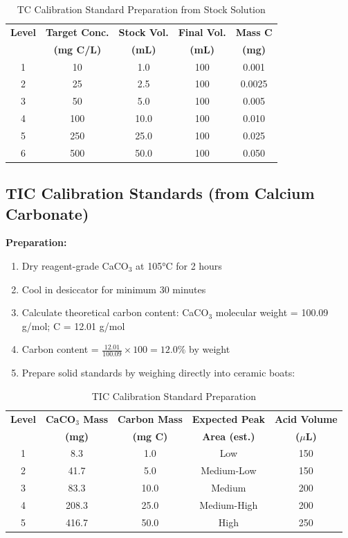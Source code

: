 \documentclass[11pt,a4paper]{article}\usepackage[]{graphicx}\usepackage[]{xcolor}
\begin{document}
\begin{table}[h]
\centering
\small
\begin{tabular}{ccccc}
\toprule
\textbf{Level} & \textbf{Target Conc.} & \textbf{Stock Vol.} & \textbf{Final Vol.} & \textbf{Mass C} \\
 & \textbf{(mg C/L)} & \textbf{(mL)} & \textbf{(mL)} & \textbf{(mg)} \\
\midrule
1 & 10 & 1.0 & 100 & 0.001 \\
2 & 25 & 2.5 & 100 & 0.0025 \\
3 & 50 & 5.0 & 100 & 0.005 \\
4 & 100 & 10.0 & 100 & 0.010 \\
5 & 250 & 25.0 & 100 & 0.025 \\
6 & 500 & 50.0 & 100 & 0.050 \\
\bottomrule
\end{tabular}
\caption{TC Calibration Standard Preparation from Stock Solution}
\end{table}

\subsection{TIC Calibration Standards (from Calcium Carbonate)}

\textbf{Preparation:}
\begin{enumerate}[noitemsep]
    \item Dry reagent-grade CaCO$_3$ at 105°C for 2 hours
    \item Cool in desiccator for minimum 30 minutes
    \item Calculate theoretical carbon content: CaCO$_3$ molecular weight = 100.09 g/mol; C = 12.01 g/mol
    \item Carbon content = $\frac{12.01}{100.09} \times 100 = 12.0\%$ by weight
    \item Prepare solid standards by weighing directly into ceramic boats:
\end{enumerate}

\begin{table}[h]
\centering
\begin{tabular}{ccccc}
\toprule
\textbf{Level} & \textbf{CaCO$_3$ Mass} & \textbf{Carbon Mass} & \textbf{Expected Peak} & \textbf{Acid Volume} \\
 & \textbf{(mg)} & \textbf{(mg C)} & \textbf{Area (est.)} & \textbf{($\mu$L)} \\
\midrule
1 & 8.3 & 1.0 & Low & 150 \\
2 & 41.7 & 5.0 & Medium-Low & 150 \\
3 & 83.3 & 10.0 & Medium & 200 \\
4 & 208.3 & 25.0 & Medium-High & 200 \\
5 & 416.7 & 50.0 & High & 250 \\
\bottomrule
\end{tabular}
\caption{TIC Calibration Standard Preparation}
\end{table}
\end{document}
